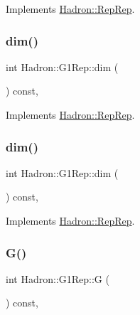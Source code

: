 Implements \mbox{\hyperlink{structHadron_1_1RepRep_a92c8802e5ed7afd7da43ccfd5b7cd92b}{Hadron\+::\+Rep\+Rep}}.

\mbox{\label{structHadron_1_1G1Rep_ab5e3b558f74546bd0c29b5a913aca993}} 
\subsubsection{\texorpdfstring{dim()}{dim()}\hspace{0.1cm}{\footnotesize\ttfamily [2/3]}}
{\footnotesize\ttfamily int Hadron\+::\+G1\+Rep\+::dim (\begin{DoxyParamCaption}{ }\end{DoxyParamCaption}) const\hspace{0.3cm}{\ttfamily [inline]}, {\ttfamily [virtual]}}



Implements \mbox{\hyperlink{structHadron_1_1RepRep_a92c8802e5ed7afd7da43ccfd5b7cd92b}{Hadron\+::\+Rep\+Rep}}.

\mbox{\label{structHadron_1_1G1Rep_ab5e3b558f74546bd0c29b5a913aca993}} 
\subsubsection{\texorpdfstring{dim()}{dim()}\hspace{0.1cm}{\footnotesize\ttfamily [3/3]}}
{\footnotesize\ttfamily int Hadron\+::\+G1\+Rep\+::dim (\begin{DoxyParamCaption}{ }\end{DoxyParamCaption}) const\hspace{0.3cm}{\ttfamily [inline]}, {\ttfamily [virtual]}}



Implements \mbox{\hyperlink{structHadron_1_1RepRep_a92c8802e5ed7afd7da43ccfd5b7cd92b}{Hadron\+::\+Rep\+Rep}}.

\mbox{\label{structHadron_1_1G1Rep_aef0192ff8fe84fbb599253d0b499cc48}} 
\subsubsection{\texorpdfstring{G()}{G()}\hspace{0.1cm}{\footnotesize\ttfamily [1/2]}}
{\footnotesize\ttfamily int Hadron\+::\+G1\+Rep\+::G (\begin{DoxyParamCaption}{ }\end{DoxyParamCaption}) const\hspace{0.3cm}{\ttfamily [inline]}, {\ttfamily [virtual]}}

